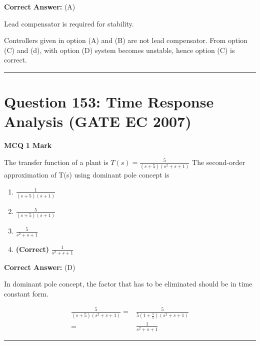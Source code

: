 \documentclass[11pt,a4paper]{article}
\begin{document}
\noindent \textbf{Correct Answer:} (A)

\begin{tcolorbox}[solbox, title=Detailed Solution -- Question 152]
Lead compensator is required for stability.

Controllers given in option (A) and (B) are not lead
compensator. From option (C) and (d), with
option (D) system becomes unstable, hence
option (C) is correct.
\end{tcolorbox}

\vspace{1.5em}
\hrule
\vspace{1.5em}

\section*{Question 153: Time Response Analysis (GATE EC 2007)}
\noindent \textbf{\color{primary}MCQ} \hfill \textbf{\color{secondary}1 Mark}


\noindent The transfer function of a plant is $T(s)=\frac{5}{(s+5)(s^{2}+s+1)}$ The second-order approximation of T(s)  using dominant pole concept is


\begin{enumerate}[label=(\Alph*)]
    \item $\frac{1}{(s+5)(s+1)}$
    \item $\frac{5}{(s+5)(s+1)}$
    \item $\frac{5}{s^{2}+s+1}$
    \item \textbf{(Correct)} $\frac{1}{s^{2}+s+1}$
\end{enumerate}

\noindent \textbf{Correct Answer:} (D)

\begin{tcolorbox}[solbox, title=Detailed Solution -- Question 153]
In dominant pole concept, the factor that has to 
 be eliminated should be in time constant form.

\[
\begin{aligned} \frac{5}{(s+5)\left(s^{2}+s+1\right)}=& \frac{5}{5\left(1+\frac{s}{5}\right)\left(s^{2}+s+1\right)} \\ =& \frac{1}{s^{2}+s+1} \end{aligned}
\]
\end{tcolorbox}

\vspace{1.5em}
\hrule
\vspace{1.5em}
\end{document}
